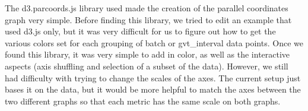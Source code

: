 \documentclass[12pt]{article}
\begin{document}
The d3.parcoords.js library used made the creation of the parallel coordinates graph very simple.  Before finding this library, we tried to edit an example that used d3.js only, but it was very difficult for us to figure out how to get the various colors set for each grouping of batch or gvt\_interval data points.  Once we found this library, it was very simple to add in color, as well as the interactive aspects (axis shuffling and selection of a subset of the data).  However, we still had difficulty with trying to change the scales of the axes.  The current setup just bases it on the data, but it would be more helpful to match the axes between the two different graphs so that each metric has the same scale on both graphs.  



\end{document}
